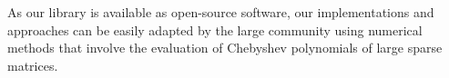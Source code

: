 \documentclass[letterpaper]{llncs}
\newcommand{\OFP}{Oakforest-PACS\xspace}
\begin{document}
As our library is available as open-source software, our implementations and approaches can be easily adapted by the large community using numerical methods that involve the evaluation of Chebyshev polynomials of large sparse matrices.


\end{document}
